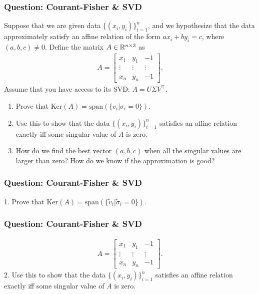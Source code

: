 \documentclass{beamer}
\begin{document}
\begin{frame}[t]
\frametitle{Question: Courant-Fisher \& SVD}
Suppose that we are given data $\{(x_i,y_i)\}_{i=1}^n$, and we hypothesize that the data approximately satisfy an affine relation of the form $a x_i + b y_i = c$, where $(a,b,c) \neq 0$. Define the matrix $A \in \mathbb{R}^{n \times 3}$ as
\begin{align*}
A = 
\begin{bmatrix}
x_1 & y_1 & -1 \\
\vdots & \vdots & \vdots \\ 
x_n & y_n & -1
\end{bmatrix}.
\end{align*}
Assume that you have access to its SVD: $A = U \Sigma V^{\top}$.
\begin{enumerate}
\item %
Prove that $\text{Ker}(A) = \text{span}(\{ v_i | \sigma_i = 0 \})$.
\item Use this to show that the data $\{(x_i,y_i)\}_{i=1}^n$ satisfies an affine relation exactly iff some singular value of $A$ is zero.
\item How do we find the best vector $(a,b,c)$ when all the singular values are larger than zero? How do we know if the approximation is good?
\end{enumerate}
\end{frame}

\begin{frame}[t]
\frametitle{Question: Courant-Fisher \& SVD}
1. Prove that $\text{Ker}(A) = \text{span}(\{ \tilde{v}_i | \tilde{\sigma}_i = 0 \})$.
\pause
\pause
\end{frame}

\begin{frame}[t]
\frametitle{Question: Courant-Fisher \& SVD}
\vspace{-20pt}
\begin{align*}
A = 
\begin{bmatrix}
x_1 & y_1 & -1 \\
\vdots & \vdots & \vdots \\ 
x_n & y_n & -1
\end{bmatrix}.
\end{align*}
2. Use this to show that the data $\{(x_i,y_i)\}_{i=1}^n$ satisfies an affine relation exactly iff some singular value of $A$ is zero.
\pause
\end{frame}
\end{document}
